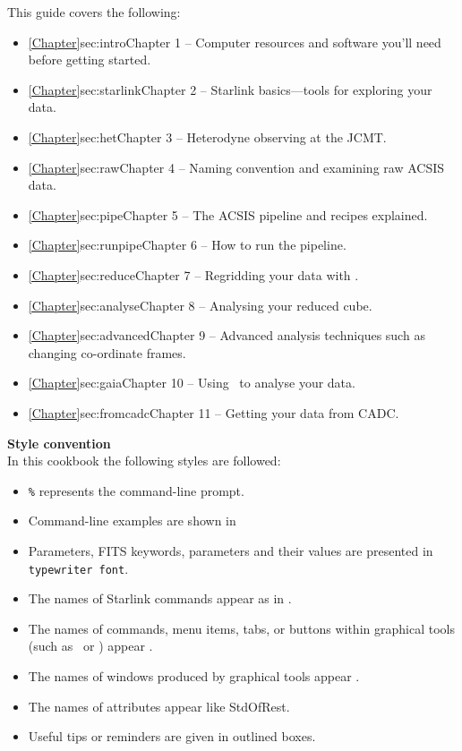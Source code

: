 \documentclass[11pt,oneside,chapters]{starlink}
\providecommand{\att}[1]{\textsf{#1}}
\begin{document}
This guide covers the following:
\begin{itemize}
\itemsep0em
\item \cref{Chapter}{sec:intro}{Chapter 1} -- Computer resources and software you'll need before getting started.
\item \cref{Chapter}{sec:starlink}{Chapter 2} -- Starlink basics---tools for exploring your data.
\item \cref{Chapter}{sec:het}{Chapter 3} -- Heterodyne observing at the JCMT.
\item \cref{Chapter}{sec:raw}{Chapter 4} -- Naming convention and examining raw ACSIS data.
\item \cref{Chapter}{sec:pipe}{Chapter 5} -- The ACSIS pipeline and recipes explained.
\item \cref{Chapter}{sec:runpipe}{Chapter 6} -- How to run the pipeline.
\item \cref{Chapter}{sec:reduce}{Chapter 7} -- Regridding your data with \makecube.
\item \cref{Chapter}{sec:analyse}{Chapter 8} -- Analysing your reduced cube.
\item \cref{Chapter}{sec:advanced}{Chapter 9} -- Advanced analysis techniques such as changing co-ordinate frames.
\item \cref{Chapter}{sec:gaia}{Chapter 10} -- Using \gaia\ to analyse your data.
\item \cref{Chapter}{sec:fromcadc}{Chapter 11} -- Getting your data from CADC.
\end{itemize}

\textbf{Style convention}\\
In this cookbook the following styles are followed:
\begin{itemize}[noitemsep,nolistsep]
\item \texttt{\%} represents the command-line prompt.
\item Command-line examples are shown in \texttt{\color{MidnightBlue}{navy typewriter font.}}
\item Parameters, FITS keywords, parameters and their values are presented in \texttt{typewriter font}.
\item The names of Starlink commands appear as in .
\item The names of commands, menu items, tabs, or buttons within graphical tools (such as \gaia\ or
\splat) appear .
\item The names of windows produced by graphical tools appear .
\item The names of attributes appear like \att{StdOfRest}.
\item Useful tips or reminders are given in outlined boxes.
\end{itemize}
\end{document}

